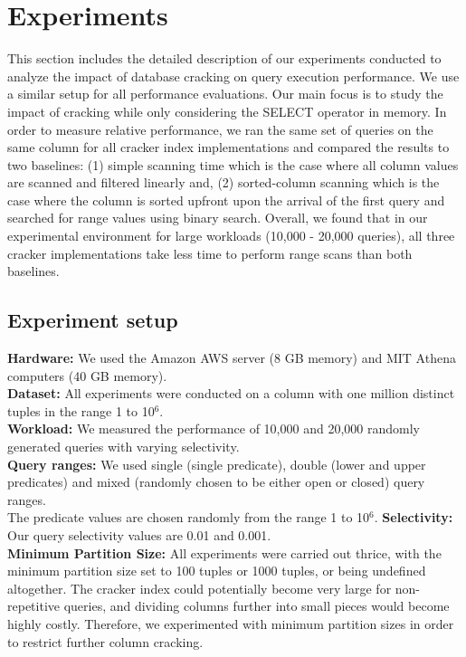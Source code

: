\section{Experiments}
\label{sec:experiments}
This section includes the detailed description of our experiments conducted to analyze the impact of database cracking on query execution performance. We use a similar setup for all performance evaluations. Our main focus is to study the impact of cracking while only considering the SELECT operator in memory. In order to measure relative performance, we ran the same set of queries on the same column for all cracker index implementations and compared the results to two baselines: (1) simple scanning time which is the case where all column values are scanned and filtered linearly and, (2) sorted-column scanning which is the case where the column is sorted upfront upon the arrival of the first query and searched for range values using binary search. Overall, we found that in our experimental environment for large workloads (10,000 - 20,000 queries), all three cracker implementations take less time to perform range scans than both baselines.

\subsection{Experiment setup}

\textbf{Hardware:} We used the Amazon AWS server (8 GB memory) and MIT Athena computers (40 GB memory). \\
\textbf{Dataset:} All experiments were conducted on a column with one million distinct tuples in the range 1 to 10${^6}$. \\
\textbf{Workload:} We measured the performance of 10,000 and 20,000 randomly generated queries with varying selectivity.\\
\textbf{Query ranges:} We used single (single predicate), double (lower and upper predicates) and mixed (randomly chosen to be either open or closed) query ranges.\\
The predicate values are chosen randomly from the range 1 to 10${^6}$.
\textbf{Selectivity:} Our query selectivity values are 0.01 and 0.001. \\
\textbf{Minimum Partition Size: } All experiments were carried out thrice, with the minimum partition size set to 100 tuples or 1000 tuples, or being undefined altogether. The cracker index could potentially become very large for non-repetitive queries, and dividing columns further into small pieces would become highly costly. Therefore, we experimented with minimum partition sizes in order to restrict further column cracking.

